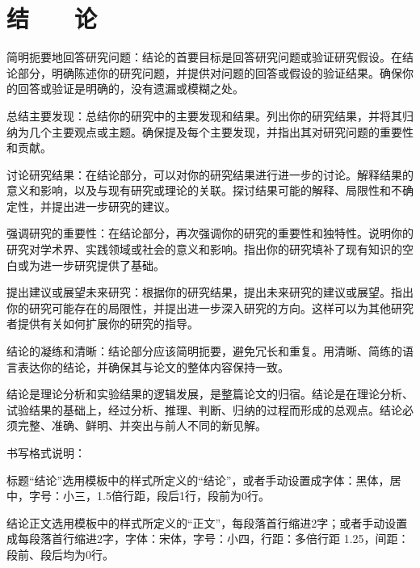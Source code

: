 
\chapter*{\hfill 结　　论 \hfill}
\label{conclusion}
\sloppy{}

简明扼要地回答研究问题：结论的首要目标是回答研究问题或验证研究假设。在结论部分，明确陈述你的研究问题，并提供对问题的回答或假设的验证结果。确保你的回答或验证是明确的，没有遗漏或模糊之处。

总结主要发现：总结你的研究中的主要发现和结果。列出你的研究结果，并将其归纳为几个主要观点或主题。确保提及每个主要发现，并指出其对研究问题的重要性和贡献。

讨论研究结果：在结论部分，可以对你的研究结果进行进一步的讨论。解释结果的意义和影响，以及与现有研究或理论的关联。探讨结果可能的解释、局限性和不确定性，并提出进一步研究的建议。

强调研究的重要性：在结论部分，再次强调你的研究的重要性和独特性。说明你的研究对学术界、实践领域或社会的意义和影响。指出你的研究填补了现有知识的空白或为进一步研究提供了基础。

提出建议或展望未来研究：根据你的研究结果，提出未来研究的建议或展望。指出你的研究可能存在的局限性，并提出进一步深入研究的方向。这样可以为其他研究者提供有关如何扩展你的研究的指导。

结论的凝练和清晰：结论部分应该简明扼要，避免冗长和重复。用清晰、简练的语言表达你的结论，并确保其与论文的整体内容保持一致。

结论是理论分析和实验结果的逻辑发展，是整篇论文的归宿。结论是在理论分析、试验结果的基础上，经过分析、推理、判断、归纳的过程而形成的总观点。结论必须完整、准确、鲜明、并突出与前人不同的新见解。

书写格式说明：

标题“结论”选用模板中的样式所定义的“结论”，或者手动设置成字体：黑体，居中，字号：小三，1.5倍行距，段后1行，段前为0行。

结论正文选用模板中的样式所定义的“正文”，每段落首行缩进2字；或者手动设置成每段落首行缩进2字，字体：宋体，字号：小四，行距：多倍行距 1.25，间距：段前、段后均为0行。